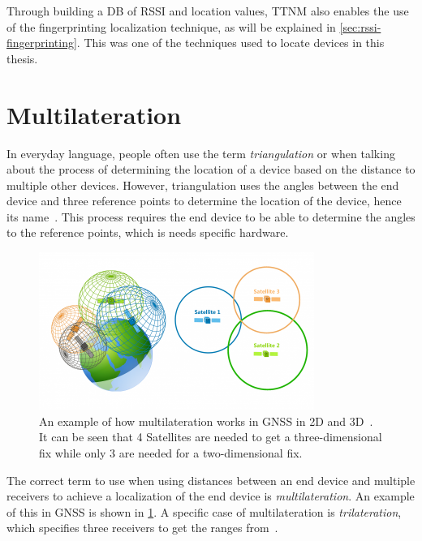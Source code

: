 Through building a \ac{DB} of \ac{RSSI} and location values, \ac{TTNM} also enables the use of the fingerprinting localization technique, as will be explained in \cref{sec:rssi-fingerprinting}.
This was one of the techniques used to locate devices in this thesis.

\section{Multilateration}\label{sec:multilateration-basics}

In everyday language, people often use the term \emph{triangulation} or when talking about the process of determining the location of a device based on the distance to multiple other devices.
However, triangulation uses the angles between the end device and three reference points to determine the location of the device, hence its name~\cite{yaro_multiangulation_2017}.
This process requires the end device to be able to determine the angles to the reference points, which is needs specific hardware.

\begin{figure}[htbp]
    \centering
    \includegraphics[width=0.8\textwidth]{pictures/multilateration/gps_multilateration.png}
    \caption{
        An example of how multilateration works in \ac{GNSS} in 2D and 3D~\protect\cite{gisgeography_how_2018}.
        It can be seen that 4 Satellites are needed to get a three-dimensional fix while only 3 are needed for a two-dimensional fix.
    }\label{pic:multilateration-gps-2d-3d-example}
\end{figure}

The correct term to use when using distances between an end device and multiple receivers to achieve a localization of the end device is \emph{multilateration}.
An example of this in \ac{GNSS} is shown in \cref{pic:multilateration-gps-2d-3d-example}.
A specific case of multilateration is \emph{trilateration}, which specifies three receivers to get the ranges from~\cite{ruiz_efficient_2013}.

